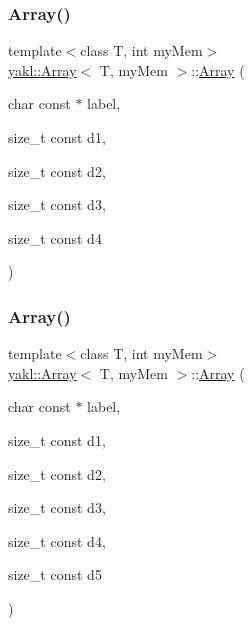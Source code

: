 \subsubsection{\texorpdfstring{Array()}{Array()}\hspace{0.1cm}{\footnotesize\ttfamily [6/12]}}
{\footnotesize\ttfamily template$<$class T, int my\+Mem$>$ \\
\hyperlink{classyakl_1_1Array}{yakl\+::\+Array}$<$ T, my\+Mem $>$\+::\hyperlink{classyakl_1_1Array}{Array} (\begin{DoxyParamCaption}\item[{char const $\ast$}]{label,  }\item[{size\+\_\+t const}]{d1,  }\item[{size\+\_\+t const}]{d2,  }\item[{size\+\_\+t const}]{d3,  }\item[{size\+\_\+t const}]{d4 }\end{DoxyParamCaption})\hspace{0.3cm}{\ttfamily [inline]}}

\mbox{\label{classyakl_1_1Array_a3be98856922ea213bcce4e4eb09f1bb1}} 
\subsubsection{\texorpdfstring{Array()}{Array()}\hspace{0.1cm}{\footnotesize\ttfamily [7/12]}}
{\footnotesize\ttfamily template$<$class T, int my\+Mem$>$ \\
\hyperlink{classyakl_1_1Array}{yakl\+::\+Array}$<$ T, my\+Mem $>$\+::\hyperlink{classyakl_1_1Array}{Array} (\begin{DoxyParamCaption}\item[{char const $\ast$}]{label,  }\item[{size\+\_\+t const}]{d1,  }\item[{size\+\_\+t const}]{d2,  }\item[{size\+\_\+t const}]{d3,  }\item[{size\+\_\+t const}]{d4,  }\item[{size\+\_\+t const}]{d5 }\end{DoxyParamCaption})\hspace{0.3cm}{\ttfamily [inline]}}

\mbox{\label{classyakl_1_1Array_a6128835586282c8a2b4f3ce754aeaa79}} 

